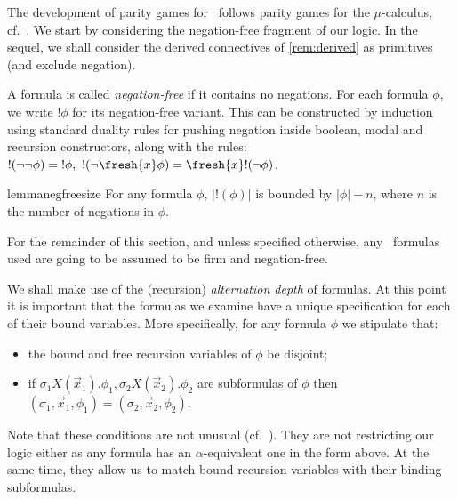 The development of parity games for \fhml\ follows
parity games for the $\mu$-calculus, cf.~\cite{EmersonJutla91}. We start by
considering the negation-free fragment of our logic. In the sequel, we shall consider the derived connectives of \cref{rem:derived} as primitives (and exclude negation).

\begin{definition}
  A formula is called \emph{negation-free}
  if it contains no negations. For each formula $\phi$, we
write $!\phi$ for its negation-free variant. This can be constructed by induction using standard duality rules for pushing negation inside boolean, modal and recursion constructors, along with the rules: \
$ !(\lnot\lnot\phi)={!\phi},\
        !(\lnot \fresh{x} \phi) = \fresh{x} !(\lnot \phi) 
$.
\end{definition}


\begin{restatable}{lemma}{negfreesize}\label{lem:negfreesize}
    For any formula $\phi$, $|!(\phi)|$ is bounded by $|\phi| - n$, where $n$ is the number of negations in $\phi$. 
\end{restatable}

For the remainder of this section, and unless specified otherwise, any \fhml\ formulas used are going to be assumed to be firm and negation-free.

We shall make use of the (recursion) \emph{alternation depth} of formulas. At this point it is important that the formulas we examine have a unique specification for each of their bound variables. More specifically, for any formula $\phi$ we stipulate that:
\begin{itemize}
\item the bound and free recursion variables of $\phi$ be disjoint;
\item if $\sigma_1 X(\vec x_1).\phi_1,\sigma_2 X(\vec x_2).\phi_2$ are subformulas of $\phi$ then $(\sigma_1,\vec x_1,\phi_1)=(\sigma_2,\vec x_2,\phi_2)$.
\end{itemize}
Note that these conditions are not unusual (cf.~\cite{KlinL17}). They are not restricting our logic either as any formula has an $\alpha$-equivalent one in the form above. At the same time, they allow us to match bound recursion variables with their binding subformulas.

